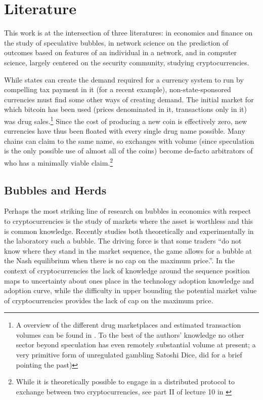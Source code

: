 \section{Literature}

This work is at the intersection of three literatures: in economics and finance on the study of speculative bubbles, in network science on the prediction of outcomes based on features of an individual in a network, and in computer science, largely centered on the security community, studying cryptocurrencies.


While states can create the demand required for a currency system to run by compelling tax payment in it (for a recent example), non-state-sponsored currencies must find some other ways of creating demand.
The initial market for which bitcoin has been used (prices denominated in it, transactions only in it) was drug sales.\footnote{A overview of the different drug marketplaces and estimated transaction volumes can be found in \cite{soska2015measuring}. To the best of the authors' knowledge no other sector beyond speculation has even remotely substantial volume at present; a very primitive form of unregulated gambling Satoshi Dice, did for a brief pointing the past)
}
Since the cost of producing a new coin is effectively zero, new currencies have thus been floated with every single drug name possible. Many chains can claim to the same name, so exchanges with volume (since speculation is the only possible use of almost all of the coins) become de-facto arbitrators of who has a minimally viable claim.\footnote{While it is theoretically possible to engage in a distributed protocol to exchange between two cryptocurrencies, see part II of lecture 10 in \cite{princeton10}}


\subsection{Bubbles and Herds}

Perhaps the most striking line of research on bubbles in economics with respect to cryptocurrencies is the study of markets where the asset is worthless and this is common knowledge. 
Recently \cite{moinas2013bubble} studies both theoretically and experimentally in the laboratory such a bubble. 
The driving force is that some traders ``do not know where they stand in the market sequence, the game allows for
a bubble at the Nash equilibrium when there is no cap on the maximum price.''.
In the context of cryptocurrencies the lack of knowledge around the sequence position maps to uncertainty about ones place in the technology adoption knowledge and adoption curve, while the difficulty in upper bounding the potential market value of cryptocurrencies provides the lack of cap on the maximum price. 


